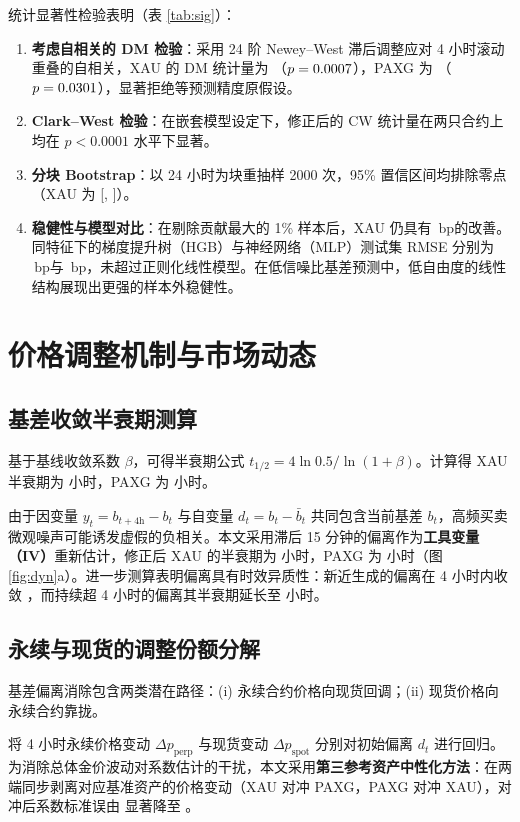 \documentclass[UTF8,zihao=5,a4paper]{ctexart}
\newcommand{\key}[1]{\textbf{#1}}
\newcommand{\bp}{\ensuremath{\,\mathrm{bp}}}
\begin{document}
统计显著性检验表明（表 \ref{tab:sig}）：
\begin{enumerate}
\item \key{考虑自相关的 DM 检验}：采用 24 阶 Newey--West 滞后调整应对 4 小时滚动重叠的自相关，XAU 的 DM 统计量为 \mXAUdm（$p = 0.0007$），PAXG 为 \mPAXGdm（$p = 0.0301$），显著拒绝等预测精度原假设。
\item \key{Clark--West 检验}：在嵌套模型设定下，修正后的 CW 统计量在两只合约上均在 $p < 0.0001$ 水平下显著。
\item \key{分块 Bootstrap}：以 24 小时为块重抽样 2000 次，95\% 置信区间均排除零点（XAU 为 [\mXAUbootlo, \mXAUboothi]）。
\item \key{稳健性与模型对比}：在剔除贡献最大的 1\% 样本后，XAU 仍具有 \mXAUtrim\bp 的改善。同特征下的梯度提升树（HGB）与神经网络（MLP）测试集 RMSE 分别为 \mXAUhgb\bp 与 \mXAUmlp\bp，未超过正则化线性模型。在低信噪比基差预测中，低自由度的线性结构展现出更强的样本外稳健性。
\end{enumerate}

\section{价格调整机制与市场动态}
\subsection{基差收敛半衰期测算}
基于基线收敛系数 $\beta$，可得半衰期公式 $t_{1/2} = 4\ln 0.5 / \ln(1+\beta)$。计算得 XAU 半衰期为 \dXAUhl 小时，PAXG 为 \dPAXGhl 小时。

由于因变量 $y_t = b_{t+4\text{h}} - b_t$ 与自变量 $d_t = b_t - \bar{b}_t$ 共同包含当前基差 $b_t$，高频买卖微观噪声可能诱发虚假的负相关。本文采用滞后 15 分钟的偏离作为\key{工具变量（IV）}重新估计，修正后 XAU 的半衰期为 \dXAUhliv 小时，PAXG 为 \dPAXGhliv 小时（图 \ref{fig:dyn}a）。进一步测算表明偏离具有时效异质性：新近生成的偏离在 4 小时内收敛 \dXAUfresh，而持续超 4 小时的偏离其半衰期延长至 \dXAUhlold 小时。

\subsection{永续与现货的调整份额分解}
基差偏离消除包含两类潜在路径：(i) 永续合约价格向现货回调；(ii) 现货价格向永续合约靠拢。

将 4 小时永续价格变动 $\Delta p_{\text{perp}}$ 与现货变动 $\Delta p_{\text{spot}}$ 分别对初始偏离 $d_t$ 进行回归。为消除总体金价波动对系数估计的干扰，本文采用\key{第三参考资产中性化方法}：在两端同步剥离对应基准资产的价格变动（XAU 对冲 PAXG，PAXG 对冲 XAU），对冲后系数标准误由 \dXAUrawseperp 显著降至 \dXAUseperp。
\end{document}

